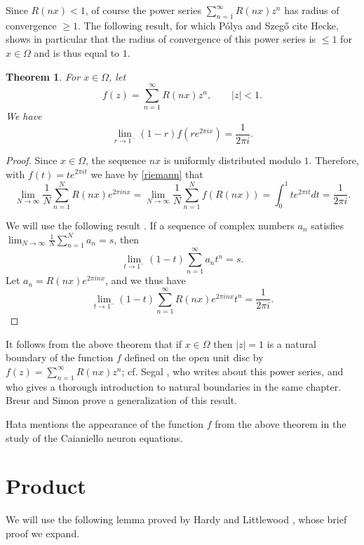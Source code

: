 \documentclass{article}
\newtheorem{theorem}{Theorem}
\begin{document}
Since $R(nx) <1$, of course the power series $\sum_{n=1}^\infty R(nx) z^n$ has radius of convergence $\geq 1$.  
The following result, for which P\'olya and Szeg\H o \cite[p.~280, Part II, No. 168]{polyaI}  cite Hecke, shows in particular that the radius of convergence of this power series is
$\leq 1$ for $x \in \Omega$ and is thus equal to $1$.

\begin{theorem}
For $x \in \Omega$, let
\[
f(z)=\sum_{n=1}^\infty R(nx) z^n,\qquad |z|<1.
\]
We have
\[
\lim_{r \to 1^-} (1-r) f(re^{2\pi i x}) = \frac{1}{2\pi i }.
\]
\end{theorem}
\begin{proof}
Since $x \in \Omega$, the sequence $nx$ is uniformly distributed modulo $1$. Therefore, with
$f(t)=te^{2\pi i t}$ we have by \eqref{riemann} that
\[
\lim_{N \to \infty} \frac{1}{N} \sum_{n=1}^N R(nx) e^{2\pi inx} =
\lim_{N \to \infty} \frac{1}{N} \sum_{n=1}^N f(R(nx))=
 \int_0^1 te^{2\pi i t} dt=\frac{1}{2\pi i}.
\]

We will use the following result \cite[p.~21, Part I, No. 88]{polyaI}.
If a sequence of complex numbers $a_n$  satisfies
$\lim_{N \to \infty} \frac{1}{N} \sum_{n=1}^N a_n=s$, then
\[
\lim_{t \to 1^-} (1-t)\sum_{n=1}^\infty a_n t^n=s.
\]
Let $a_n=R(nx) e^{2\pi inx}$, and we thus have
\[
\lim_{t \to 1^-} (1-t)\sum_{n=1}^\infty R(nx) e^{2\pi inx} t^n=\frac{1}{2\pi i}.
\]
\end{proof}

It follows from the above theorem that if $x \in \Omega$ then
$|z|=1$ is a natural boundary of the function $f$ defined on the open unit disc by $f(z)=\sum_{n=1}^\infty R(nx)z^n$; cf. Segal \cite[p.~255, Chapter 6]{segal}, who writes about this
power series, and who gives a thorough introduction to natural boundaries in the same chapter.
Breur and Simon \cite{breuer} prove a generalization of this result.





Hata \cite[p.~173, Problem 12.6]{hata} 
mentions the appearance of the function  $f$ from the above theorem in the study of the Caianiello neuron equations. 




\section{Product}
We will use the following lemma proved by Hardy and Littlewood \cite[p.~89]{XXIV},  whose brief proof we expand.
\end{document}
